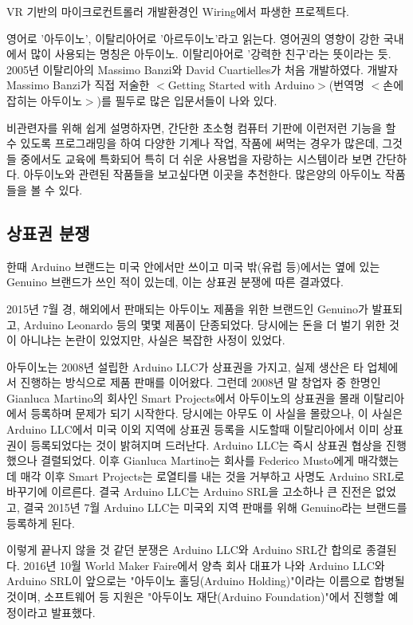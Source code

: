 \documentclass[12pt, a4paper, oneside]{book}
\begin{document}
VR 기반의 마이크로컨트롤러 개발환경인 Wiring에서 파생한 프로젝트다.

영어로 '아두이노', 이탈리아어로 '아르두이노'라고 읽는다. 
영어권의 영향이 강한 국내에서 많이 사용되는 명칭은 아두이노. 이탈리아어로 '강력한 친구'라는 뜻이라는 듯. 2005년 이탈리아의 Massimo Banzi와 David Cuartielles가 처음 개발하였다. 
개발자 Massimo Banzi가 직접 저술한 $<$Getting Started with Arduino$>$(번역명 $<$손에 잡히는 아두이노$>$)를 필두로 많은 입문서들이 나와 있다.

비관련자를 위해 쉽게 설명하자면, 간단한 초소형 컴퓨터 기판에 이런저런 기능을 할 수 있도록 프로그래밍을 하여 다양한 기계나 작업, 작품에 써먹는 경우가 많은데, 그것들 중에서도 교육에 특화되어 특히 더 쉬운 사용법을 자랑하는 시스템이라 보면 간단하다. 
아두이노와 관련된 작품들을 보고싶다면 이곳을 추천한다. 
많은양의 아두이노 작품들을 볼 수 있다.


%
	\subsection{ 상표권 분쟁 }

한때 Arduino 브랜드는 미국 안에서만 쓰이고 미국 밖(유럽 등)에서는 옆에 있는 Genuino 브랜드가 쓰인 적이 있는데, 이는 상표권 분쟁에 따른 결과였다.

2015년 7월 경, 해외에서 판매되는 아두이노 제품을 위한 브랜드인 Genuino가 발표되고, Arduino Leonardo 등의 몇몇 제품이 단종되었다. 
당시에는 돈을 더 벌기 위한 것이 아니냐는 논란이 있었지만, 사실은 복잡한 사정이 있었다.

아두이노는 2008년 설립한 Arduino LLC가 상표권을 가지고, 실제 생산은 타 업체에서 진행하는 방식으로 제품 판매를 이어왔다. 
그런데 2008년 말 창업자 중 한명인 Gianluca Martino의 회사인 Smart Projects에서 아두이노의 상표권을 몰래 이탈리아에서 등록하며 문제가 되기 시작한다. 
당시에는 아무도 이 사실을 몰랐으나, 이 사실은 Arduino LLC에서 미국 이외 지역에 상표권 등록을 시도할때 이탈리아에서 이미 상표권이 등록되었다는 것이 밝혀지며 드러난다. 
Arduino LLC는 즉시 상표권 협상을 진행했으나 결렬되었다. 
이후 Gianluca Martino는 회사를 Federico Musto에게 매각했는데 매각 이후 Smart Projects는 로열티를 내는 것을 거부하고 사명도 Arduino SRL로 바꾸기에 이르른다. 
결국 Arduino LLC는 Arduino SRL을 고소하나 큰 진전은 없었고, 결국 2015년 7월 Arduino LLC는 미국외 지역 판매를 위해 Genuino라는 브랜드를 등록하게 된다.

이렇게 끝나지 않을 것 같던 분쟁은 Arduino LLC와 Arduino SRL간 합의로 종결된다. 
2016년 10월 World Maker Faire에서 양측 회사 대표가 나와 Arduino LLC와 Arduino SRL이 앞으로는 "아두이노 홀딩(Arduino Holding)"이라는 이름으로 합병될 것이며, 소프트웨어 등 지원은 "아두이노 재단(Arduino Foundation)"에서 진행할 예정이라고 발표했다.
\end{document}
